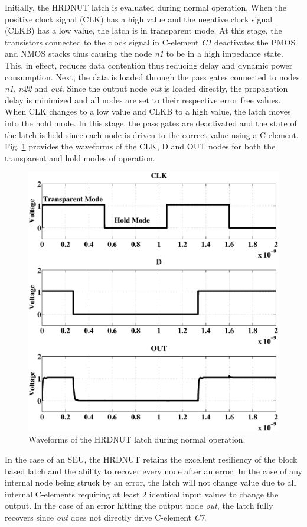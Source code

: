 Initially, the HRDNUT latch is evaluated during normal operation. When the positive clock signal (CLK) has a high value and the negative clock signal (CLKB) has a low value, the latch is in transparent mode. At this stage, the transistors connected to the clock signal in C-element \textit{C1} deactivates the PMOS and NMOS stacks thus causing the node \textit{n1} to be in a high impedance state. This, in effect, reduces data contention thus reducing delay and dynamic power consumption. Next, the data is loaded through the pass gates connected to nodes \textit{n1}, \textit{n22} and \textit{out}. Since the output node \textit{out} is loaded directly, the propagation delay is minimized and all nodes are set to their respective error free values. When CLK changes to a low value and CLKB to a high value, the latch moves into the hold mode. In this stage, the pass gates are deactivated and the state of the latch is held since each node is driven to the correct value using a C-element. Fig. \ref{NormOp} provides the waveforms of the CLK, D and OUT nodes for both the transparent and hold modes of operation.

\begin{figure}[!htbp]
	\centering
	\includegraphics[width=0.65\linewidth]{Figures/defaultoperation.eps}
	\caption{Waveforms of the HRDNUT latch during normal operation.}
	\label{NormOp}
\end{figure}

In the case of an SEU, the HRDNUT retains the excellent resiliency of the block based latch and the ability to recover every node after an error. In the case of any internal node being struck by an error, the latch will not change value due to all internal C-elements requiring at least 2 identical input values to change the output. In the case of an error hitting the output node \textit{out}, the latch fully recovers since \textit{out} does not directly drive C-element \textit{C7}.

